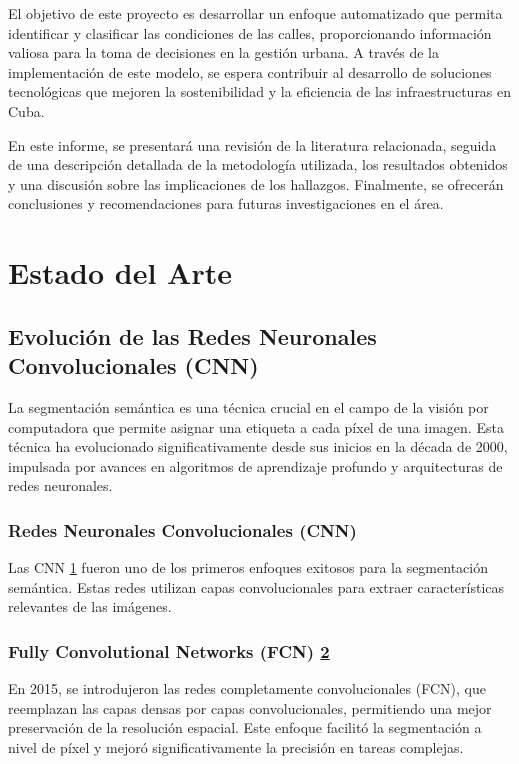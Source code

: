 \documentclass{article}
\begin{document}
El objetivo de este proyecto es desarrollar un enfoque automatizado que permita identificar y clasificar las condiciones de las calles, proporcionando información valiosa para la toma de decisiones en la gestión urbana. A través de la implementación de este modelo, se espera contribuir al desarrollo de soluciones tecnológicas que mejoren la sostenibilidad y la eficiencia de las infraestructuras en Cuba.

En este informe, se presentará una revisión de la literatura relacionada, seguida de una descripción detallada de la metodología utilizada, los resultados obtenidos y una discusión sobre las implicaciones de los hallazgos. Finalmente, se ofrecerán conclusiones y recomendaciones para futuras investigaciones en el área.

\section{Estado del Arte}

\subsection{Evoluci\'on de las Redes Neuronales Convolucionales (CNN)}
La segmentación semántica es una técnica crucial en el campo de la visión por computadora que permite asignar una etiqueta a cada píxel de una imagen. Esta técnica ha evolucionado significativamente desde sus inicios en la década de 2000, impulsada por avances en algoritmos de aprendizaje profundo y arquitecturas de redes neuronales.

\subsubsection{Redes Neuronales Convolucionales (CNN)}
Las CNN \href{https://www.semanticscholar.org/paper/Rich-Feature-Hierarchies-for-Accurate-Object-and-Girshick-Donahue/2f4df08d9072fc2ac181b7fced6a245315ce05c8}{1} fueron uno de los primeros enfoques exitosos para la segmentación semántica. Estas redes utilizan capas convolucionales para extraer características relevantes de las imágenes.

\subsubsection{Fully Convolutional Networks (FCN) \href{https://www.semanticscholar.org/paper/Fully-convolutional-networks-for-semantic-Shelhamer-Long/6fc6803df5f9ae505cae5b2f178ade4062c768d0}{2}} 
En 2015, se introdujeron las redes completamente convolucionales (FCN), que reemplazan las capas densas por capas convolucionales, permitiendo una mejor preservación de la resolución espacial. Este enfoque facilitó la segmentación a nivel de píxel y mejoró significativamente la precisión en tareas complejas.
\end{document}
